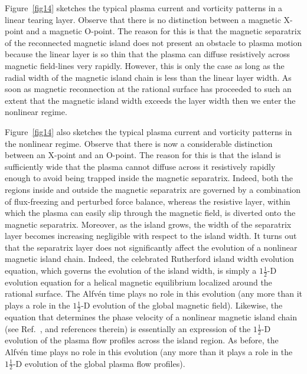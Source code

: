 \documentclass[12pt,prb,aps]{revtex4-1}
\begin{document}
 Figure~\ref{fig14} sketches the typical plasma current and vorticity patterns in a linear tearing layer. Observe that there is
 no distinction between a magnetic X-point and a magnetic 
O-point. The reason for this is that the magnetic separatrix
of the reconnected magnetic island does not present an obstacle
to plasma motion because the linear layer is so thin that the
plasma can diffuse resistively across magnetic field-lines very rapidly. However, this is only the case as long
as the radial width of the magnetic island chain is less than the linear layer width. As soon as magnetic reconnection
at the rational surface has proceeded to such an extent that
the magnetic island width exceeds the layer width then we enter the nonlinear regime. 

Figure~\ref{fig14} also sketches the
typical plasma current and vorticity patterns in the nonlinear regime. Observe that there is now a considerable distinction between an X-point and an O-point. The reason for this is that the island is sufficiently wide that the plasma cannot diffuse across it resistively rapidly enough to
avoid being trapped inside the magnetic separatrix. Indeed, both the regions inside and outside the magnetic separatrix
are governed by a combination of flux-freezing and perturbed force balance, whereas the resistive
layer, within which the plasma can easily slip through the magnetic field,  is diverted onto the magnetic separatrix. Moreover, as
the island grows, the width of the separatrix layer becomes
increasing negligible with respect to the island width. It
turns out that the separatrix layer does not significantly affect the evolution of a nonlinear magnetic island chain. Indeed,
the celebrated Rutherford island width evolution equation,
which governs the evolution of the island width, is simply a
$1\tfrac{1}{2}$-D evolution equation for a helical magnetic
equilibrium localized around the rational surface.\cite{ruth}
The Alfv\'{e}n time plays no role in this evolution (any more
than it plays a role in the $1\tfrac{1}{2}$-D evolution of
the global magnetic field). Likewise, the equation that
determines the phase velocity of a nonlinear magnetic island chain (see Ref.~, and references therein) is essentially an
expression of the $1\tfrac{1}{2}$-D evolution of the plasma
flow profiles across the island region. As before, the  Alfv\'{e}n time plays no role in this evolution (any more
than it plays a role in the $1\tfrac{1}{2}$-D evolution of
the global plasma flow profiles). 
\end{document}
